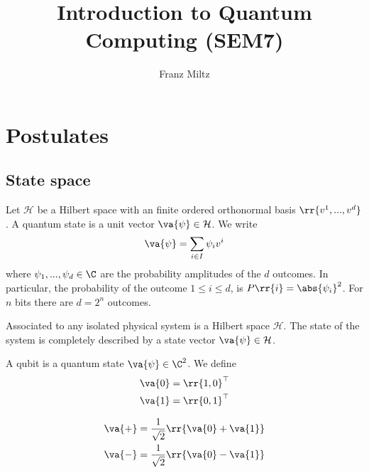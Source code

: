 \documentclass{article}
\title{Introduction to Quantum Computing (SEM7)}
\author{Franz Miltz}
\begin{document}
\maketitle
\tableofcontents
\pagebreak

\section{Postulates}

\subsection{State space}

\begin{definition}
  Let $\mathcal H$ be a Hilbert space with an finite ordered orthonormal basis
  $\rr{v^1, ..., v^d}$. A quantum state is a unit vector $\va{\psi}\in\mathcal H$.
  We write
  \begin{align*}
    \va{\psi} = \sum_{i\in I} \psi_i v^i
  \end{align*}
  where $\psi_1,...,\psi_d\in\C$ are the probability amplitudes of the $d$ outcomes.
  In particular, the probability of the outcome $1\leq i\leq d$, is $P \rr{ i } = \abs{ \psi_i }^2$.
  For $n$ bits there are $d=2^n$ outcomes.
\end{definition}

\begin{axiom}
  Associated to any isolated physical system is a Hilbert space $\mathcal H$. The state of the system
  is completely described by a state vector $\va{\psi}\in\mathcal H$.
\end{axiom}

\begin{definition}
  \label{def:qubit}
  A qubit is a quantum state $ \va{\psi}\in\C^2$. We define
  \begin{align*}
    \va{ 0 } = \rr{ 1, 0 }^\top \\
    \va{ 1 } = \rr{ 0, 1 }^\top
  \end{align*}
\end{definition}

\begin{definition}
  \label{def:superposition}
  \begin{align*}
    \va{ + } = \frac{1}{\sqrt{2}} \rr{ \va{ 0 } + \va{ 1 } } \\
    \va{ - } = \frac{1}{\sqrt{2}} \rr{ \va{ 0 } - \va{ 1 } }
  \end{align*}
\end{definition}
\end{document}
